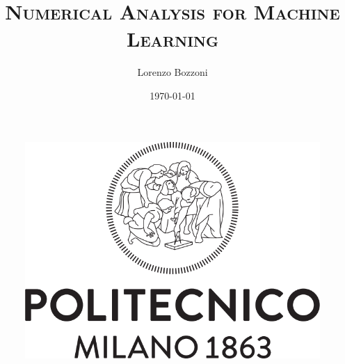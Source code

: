 \documentclass{article}
\title{\textsc{Numerical Analysis for Machine Learning}}
\author{Lorenzo Bozzoni}
\date{\today}
\begin{document}
\begin{figure}[H]
  \centering
  \includegraphics[scale=0.3]{../images/LogoPolimi.png}
\end{figure}
\maketitle
\newpage
\tableofcontents















\end{document}
